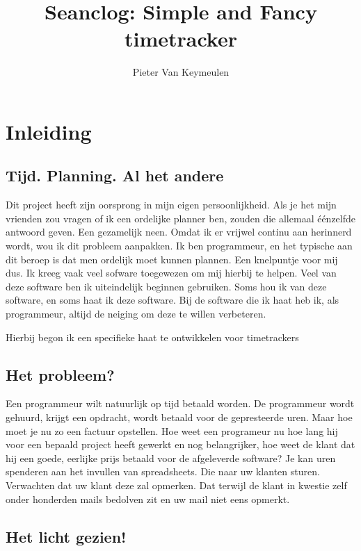 \documentclass[a4paper,11pt]{article}
\begin{document}
\title{Seanclog: Simple and Fancy timetracker}
\author{Pieter Van Keymeulen}
\maketitle

\section{Inleiding}

\subsection{Tijd. Planning. Al het andere}
Dit project heeft zijn oorsprong in mijn eigen persoonlijkheid. Als je het mijn
vrienden zou vragen of ik een ordelijke planner ben, zouden die allemaal
éénzelfde antwoord geven. Een gezamelijk neen. Omdat ik er vrijwel continu aan
herinnerd wordt, wou ik dit probleem aanpakken. Ik ben programmeur, en het
typische aan dit beroep is dat men ordelijk moet kunnen plannen. Een knelpuntje
voor mij dus. Ik kreeg vaak veel sofware toegewezen om mij hierbij te helpen.
Veel van deze software ben ik uiteindelijk beginnen gebruiken. Soms hou ik van
deze software, en soms haat ik deze software. Bij de software die ik haat heb
ik, als programmeur, altijd de neiging om deze te willen verbeteren.

Hierbij begon ik een specifieke haat te ontwikkelen voor timetrackers

\subsection{Het probleem?}
Een programmeur wilt natuurlijk op tijd betaald worden. De programmeur wordt
gehuurd, krijgt een opdracht, wordt betaald voor de gepresteerde uren. Maar hoe
moet je nu zo een factuur opstellen. Hoe weet een programeur nu hoe lang hij
voor een bepaald project heeft gewerkt en nog belangrijker, hoe weet de klant
dat hij een goede, eerlijke prijs betaald voor de afgeleverde software? Je kan
uren spenderen aan het invullen van spreadsheets. Die naar uw klanten sturen.
Verwachten dat uw klant deze zal opmerken. Dat terwijl de klant in kwestie zelf
onder honderden mails bedolven zit en uw mail niet eens opmerkt.

\subsection{Het licht gezien!}
\end{document}
